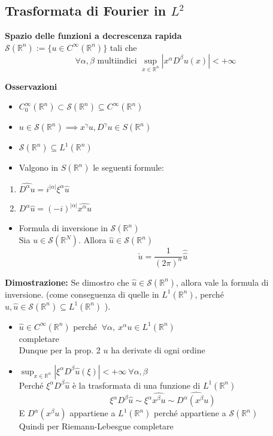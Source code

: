 \documentclass[a4paper]{article}
\newcommand{\R}{\mathbb{R}}
\begin{document}
\subsection{Trasformata di Fourier in $L^2$ }
\begin{tcolorbox}
\textbf{Spazio delle funzioni a decrescenza rapida}
\\$\mathcal S(\R^n):= \{u\in C^\infty(\R^n)\} $ tali che 
\[ \forall \alpha, \beta\text{ multiindici }\sup_{x\in \R^n}|x^\alpha D^\beta u(x)|<+\infty\]
\end{tcolorbox}
\textbf{Osservazioni} 
\begin{itemize}
	\item $C^\infty_0(\R^n)\subset \mathcal S(\R^n)\subseteq  C^\infty(\R^n)$ 
	\item $u\in \mathcal S(\R^n)\implies x^\gamma u, D^\gamma u\in S(\R^n)$ 
	\item $\mathcal S(\R^n) \subseteq  L^{1}(\R^n)$
	\item Valgono in $S(\R^n)$ le seguenti formule:
\end{itemize}
\begin{enumerate}
	\item $\widehat{D^\alpha u}=i^{|\alpha|}\xi^\alpha \hat{u}$ 
	\item $D^\alpha \hat{u}=(-i)^{|\alpha|}\widehat{x^\alpha u}$
\end{enumerate}
\begin{itemize}
	\item Formula di inversione in $\mathcal S(\R^n)$ 
		\\Sia $u\in \mathcal S(\R^N)$. Allora $\hat{u}\in \mathcal S(\R^n)$ 
		\[\check u=\frac{1}{(2\pi)^n}\hat{\hat{u}}\]
\end{itemize}
\textbf{Dimostrazione: }Se dimostro che $\hat{u}\in \mathcal S(\R^n)$, allora vale la formula di inversione. (come conseguenza di quelle in $L^{1}(\R^n)$, perché $u,\hat{u}\in \mathcal S(\R^n)\subseteq  L^{1}(\R^n)$ ).
\begin{itemize}
	\item $\hat{u}\in C^\infty(\R^n) $ perché $\ \forall \alpha,\ x^\alpha u \in L^{1}(\R^n)$
		\\completare
		\\Dunque per la prop. 2 $u$ ha derivate di ogni ordine
	\item $\sup_{x\in \R^n}|\xi^\alpha D^\beta \hat{u}(\xi)|<+\infty\ \forall \alpha,\beta$
		\\Perché $\xi^\alpha D^\beta \hat{u}$ è la trasformata di una funzione di $L^{1}(\R^n)$ 
		\[\xi^\alpha D^\beta \hat{u}\sim \xi^\alpha \widehat{x^\beta u}\sim \widehat{D^\alpha (x^\beta u)}\]
	E $D^\alpha(x^\beta u)$ appartiene a $L^{1}(\R^n)$ perché appartiene a $\mathcal S(\R^n)$ 
	\\Quindi per Riemann-Lebesgue completare

\end{itemize}
\end{document}
